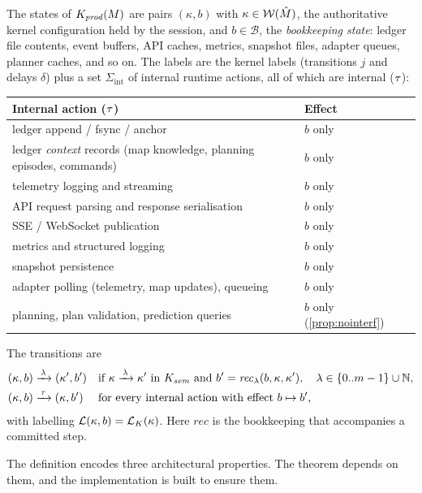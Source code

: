 \begin{definition}\label{def:kprod}
The states of $K_{\mathit{prod}}(M)$ are pairs $(\kappa,b)$ with $\kappa\in\mathcal{W}(\hat M)$, the
authoritative kernel configuration held by the session, and
$b\in\mathcal{B}$, the \emph{bookkeeping state}: ledger file contents, event
buffers, API caches, metrics, snapshot files, adapter queues, planner caches,
and so on. The labels are the kernel labels (transitions $j$ and delays $\delta$)
plus a set $\Sigma_{\mathrm{int}}$ of internal runtime actions, all of which are
internal ($\tau$):
\begin{center}
\begin{tabular}{@{}ll@{}}
\toprule
Internal action ($\tau$) & Effect \\ \midrule
ledger append / fsync / anchor & $b$ only \\
ledger \emph{context} records (map knowledge, planning episodes, commands) & $b$ only \\
telemetry logging and streaming & $b$ only \\
API request parsing and response serialisation & $b$ only \\
SSE / WebSocket publication & $b$ only \\
metrics and structured logging & $b$ only \\
snapshot persistence & $b$ only \\
adapter polling (telemetry, map updates), queueing & $b$ only \\
planning, plan validation, prediction queries & $b$ only (\cref{prop:nointerf}) \\
\bottomrule
\end{tabular}
\end{center}
The transitions are
\begin{align*}
(\kappa,b)&\xrightarrow{\,\lambda\,}(\kappa',b') && \text{if } \kappa\xrightarrow{\,\lambda\,}\kappa' \text{ in }K_{\mathit{sem}}
   \text{ and } b'=\mathit{rec}_\lambda(b,\kappa,\kappa'), \quad \lambda\in\{0..m-1\}\cup\mathbb{N},\\
(\kappa,b)&\xrightarrow{\,\tau\,}(\kappa,b') && \text{for every internal action with effect } b\mapsto b',
\end{align*}
with labelling $\mathcal{L}(\kappa,b)=\mathcal{L}_K(\kappa)$. Here $\mathit{rec}$ is the
bookkeeping that accompanies a committed step.
\end{definition}

The definition encodes three architectural properties. The theorem
depends on them, and the implementation is built to ensure them.

